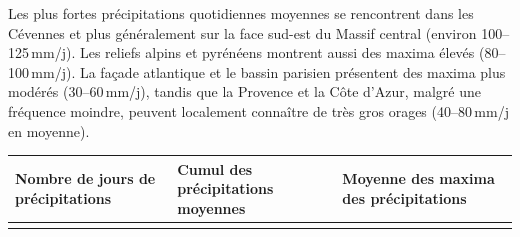 \documentclass[
  article,
  nofooter,
  noheadings]{jss}
\begin{document}
Les plus fortes précipitations quotidiennes moyennes se rencontrent dans
les Cévennes et plus généralement sur la face sud-est du Massif central
(environ 100--125\,mm/j). Les reliefs alpins et pyrénéens montrent aussi
des maxima élevés (80--100\,mm/j). La façade atlantique et le bassin
parisien présentent des maxima plus modérés (30--60\,mm/j), tandis que
la Provence et la Côte d'Azur, malgré une fréquence moindre, peuvent
localement connaître de très gros orages (40--80\,mm/j en moyenne).

\begin{longtable}[]{@{}
  >{\centering\arraybackslash}p{}
  >{\centering\arraybackslash}p{}
  >{\centering\arraybackslash}p{}@{}}
\toprule\noalign{}
\begin{minipage}[b]{\linewidth}\centering
\small Nombre de jours de précipitations
\end{minipage} & \begin{minipage}[b]{\linewidth}\centering
\small Cumul des précipitations moyennes
\end{minipage} & \begin{minipage}[b]{\linewidth}\centering
\small Moyenne des maxima des précipitations
\end{minipage} \\
\midrule\noalign{}
\endhead
\bottomrule\noalign{}
\endlastfoot

\end{longtable}
\end{document}
